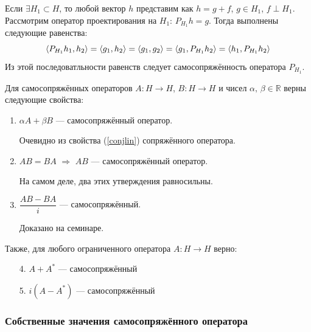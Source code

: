 \documentclass[12pt]{article}
\begin{document}
			\example Если $\exists H_1 \subset H$, то любой вектор $h$ представим как $h = g+f$, $g \in H_1$, $f\perp H_1$.
			Рассмотрим оператор проектирования на $H_1$: $P_{H_1}h = g$. Тогда выполнены следующие равенства:
			$$\left\langle P_{H_1}h_1, h_2 \right\rangle = \left\langle g_1, h_2 \right\rangle = \left\langle g_1, g_2 \right\rangle = \left\langle g_1, P_{H_1}h_2 \right\rangle = \left\langle h_1, P_{H_1}h_2 \right\rangle$$
			Из этой последоватльности равенств следует самосопряжённость оператора $P_{H_1}$.
	
			Для самосопряжённых операторов $A : H \rightarrow H$, $B : H \rightarrow H$ и чисел $\alpha,\, \beta \in \mathbb{R}$ верны следующие
			свойства:
			\begin{enumerate}
				\item $\alpha A + \beta B$ --- самосопряжённый оператор.

				Очевидно из свойства (\ref{conjlin}) сопряжённого оператора.
		
				\item $AB = BA$ $\Rightarrow$ $AB$ --- самосопряжённый оператор.
		

				На самом деле, два этих утверждения равносильны.
		
				\item $\dfrac{AB - BA}{i}$ --- самосопряжённый.
		
				{\color{gray}
				Доказано на семинаре.
				}
			\end{enumerate}
			Также, для любого ограниченного оператора $A: H \rightarrow H$ верно:
			\begin{enumerate}
				\item[4.] $A+A^{*}$ --- самосопряжённый
				\item[5.] $i(A-A^{*})$ --- самосопряжённый
			\end{enumerate}
	
		\subsubsection{Собственные значения самосопряжённого оператора}
	
\end{document}

